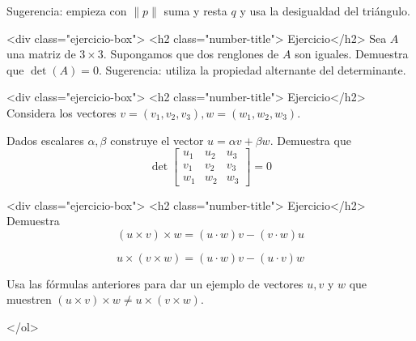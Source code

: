 \documentclass{article}
\theoremstyle{definition}
\begin{document}
                Sugerencia: empieza con $\|p\|$ suma  y resta $q$ y usa la desigualdad del triángulo.	

<div class="ejercicio-box"> <h2 class="number-title"> Ejercicio</h2>\label{Ejer:DeterRenglonesRepetidos} Sea $A$ una matriz de $3 \times 3$. Supongamos que dos renglones de $A$ son iguales. Demuestra
que $\det(A)=0$. Sugerencia: utiliza la propiedad alternante del determinante.

<div class="ejercicio-box"> <h2 class="number-title"> Ejercicio</h2> Considera los vectores $v=(v_1,v_2,v_3), w=(w_1,w_2,w_3)$. 

Dados escalares $\alpha, \beta$ construye
el vector $u=\alpha v+ \beta w$. Demuestra que 
$$
\det\left[
\begin{array}{ccc}
u_1 & u_2 & u_3 \\
v_1 & v_2 & v_3 \\
w_1 & w_2 & w_3
\end{array}
\right]=0
$$


<div class="ejercicio-box"> <h2 class="number-title"> Ejercicio</h2> Demuestra 
	$$
	(u\times v) \times w= (u \cdot w) v - (v \cdot w ) u
	$$
	
	$$
	u\times (v\times w)=   (u \cdot w )v -(u \cdot v ) w	
	$$

	Usa las fórmulas anteriores para dar un ejemplo de vectores $u,v$ y $w$ que muestren 
	$(u\times v) \times w\ne u \times (v \times w) $.
	
	</ol>





  
       
\end{document}
